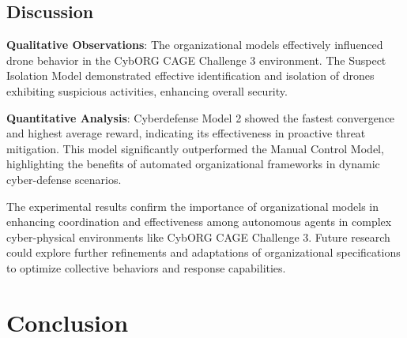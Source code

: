 \documentclass[conference]{IEEEtran}
\newcounter{relation}
\begin{document}
\subsection{Discussion}

\textbf{Qualitative Observations}:
The organizational models effectively influenced drone behavior in the CybORG CAGE Challenge 3 environment. The Suspect Isolation Model demonstrated effective identification and isolation of drones exhibiting suspicious activities, enhancing overall security.

\textbf{Quantitative Analysis}:
Cyberdefense Model 2 showed the fastest convergence and highest average reward, indicating its effectiveness in proactive threat mitigation. This model significantly outperformed the Manual Control Model, highlighting the benefits of automated organizational frameworks in dynamic cyber-defense scenarios.

The experimental results confirm the importance of organizational models in enhancing coordination and effectiveness among autonomous agents in complex cyber-physical environments like CybORG CAGE Challenge 3. Future research could explore further refinements and adaptations of organizational specifications to optimize collective behaviors and response capabilities.



\section{Conclusion}\label{sec:conclusion}




\end{document}
